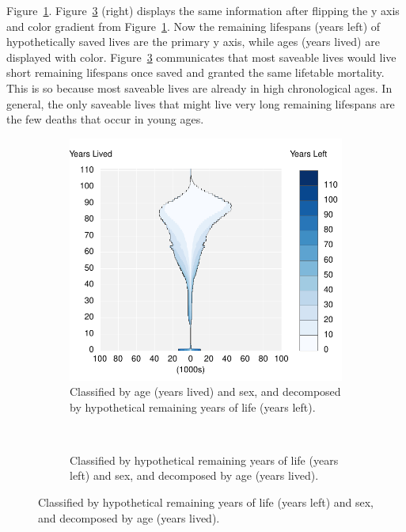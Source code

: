 \documentclass{article}
\begin{document}
Figure~\ref{fig:Day}. Figure~\ref{fig:Dya} (right) displays the same
information after flipping the y axis and color gradient from
Figure~\ref{fig:Day}. Now the remaining lifespans (years left) of
hypothetically saved lives are the primary y axis, while ages (years lived)
are displayed with color. Figure~\ref{fig:Dya} communicates that most saveable
lives would live short remaining lifespans once saved and granted the same lifetable
mortality. This is so because most saveable lives are already in high
chronological ages. In general, the only saveable lives that might live very
long remaining lifespans are the few deaths that occur in young ages.
\begin{figure}
\centering
\caption{US, 2010 potentially saveable lives (Deaths)*}
\label{fig:1}
\begin{subfigure}[b]{.48\linewidth}
\centering
	\caption{Classified by age (years lived) and sex, and decomposed
by hypothetical remaining years of life (years left).}
	\label{fig:Day}
	\includegraphics[scale=.55]{Figures/Deathsxy10.pdf}	
\end{subfigure}
~
\begin{subfigure}[b]{.48\linewidth}
\centering
    \caption{Classified by hypothetical remaining years of life
(years left) and sex, and decomposed by age (years lived).}
	\label{fig:Dya}

\end{subfigure}
\end{figure}
\end{document}
